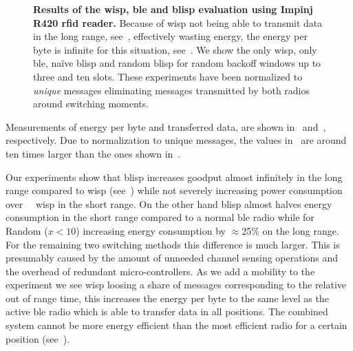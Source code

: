 \documentclass[conference,letterpaper,twoside,final,10pt]{IEEEtran}
\begin{document}
\begin{figure}
	\centering
\caption{\textbf{Results of the \acs{wisp}, \acs{ble} and \acs{blisp} evaluation using Impinj R420 \acs{rfid} reader.}
	Because of \acs{wisp} not being able to transmit data in the long range, see~, effectively wasting energy, the energy per byte is infinite for this situation, see~.
	We show the only \acs{wisp}, only \acs{ble}, na\"ive \acs{blisp} and random \acs{blisp} for random backoff windows up to three and ten slots.
	These experiments have been normalized to \emph{unique} messages eliminating messages transmitted by both radios around switching moments.
	}
	\label{fig:blisp_results}
\end{figure}

Measurements of energy per byte and transferred data, are shown in~ and~, respectively. Due to normalization to unique messages, the values in~ are around ten times larger than the ones shown in~.

Our experiments show that \ac{blisp} increases goodput almost infinitely in the long range compared to \ac{wisp} (see~) while not severely increasing power consumption over {~~}\ac{wisp} in the short range.
On the other hand \ac{blisp} almost halves energy consumption in the short range compared to a normal \ac{ble} radio while for Random ($x<10$) increasing energy consumption by $\approx$25\% on the long range. For the remaining two switching methods this difference is much larger. This is presumably caused by the amount of unneeded channel sensing operations and the overhead of redundant micro-controllers.
As we add a mobility to the experiment we see \ac{wisp} loosing a share of messages corresponding to the relative out of range time, this increases the energy per byte to the same level as the active \ac{ble} radio which is able to transfer data in all positions.
The combined system cannot be more energy efficient than the most efficient radio for a certain position (see~).
\end{document}
